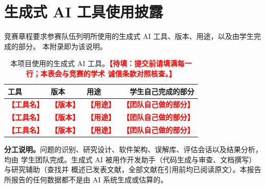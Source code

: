 \documentclass[11pt,a4paper,UTF8,fontset=windows]{ctexart}
\newcommand{\fillin}[1]{\textcolor{red}{\textbf{【待填：#1】}}}
\newcommand{\fillc}[1]{\textcolor{red}{\textbf{【#1】}}}
\begin{document}
\appendix
\section{生成式 AI 工具使用披露}

竞赛章程要求参赛队伍列明所使用的生成式 AI 工具、版本、用途，以及由学生完成的部分。
本附录即为该说明。

\begin{table}[h]
\centering
\small
\begin{tabularx}{\textwidth}{@{}p{2.8cm} p{1.5cm} p{2.8cm} R@{}}
\toprule
\textbf{工具} & \textbf{版本} & \textbf{用途} & \textbf{学生自己完成的部分} \\
\midrule
\fillc{工具名} & \fillc{版本} & \fillc{用途} & \fillc{团队自己做的部分} \\
\fillc{工具名} & \fillc{版本} & \fillc{用途} & \fillc{团队自己做的部分} \\
\fillc{工具名} & \fillc{版本} & \fillc{用途} & \fillc{团队自己做的部分} \\
\bottomrule
\end{tabularx}
\caption{本项目使用的生成式 AI 工具。\fillin{提交前请填满每一行；本表会与竞赛的学术
诚信条款对照核查。}}
\label{tab:ai}
\end{table}

\textbf{分工说明。}问题的识别、研究设计、软件架构、误解库、评估会话以及结果分析，均由
学生团队完成。生成式 AI 被用作开发助手（代码生成与审查、文档撰写）与研究辅助（查找并
概述已发表文献，全部文献在引用前均已阅读原文）。本报告所报告的任何数据都不是由 AI
系统生成或估算的。
\end{document}
